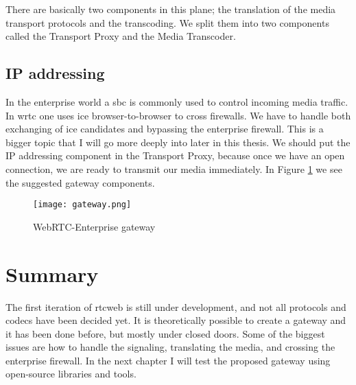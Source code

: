 There are basically two components in this plane; the translation of the media transport protocols and the transcoding. We split them into two components called the Transport Proxy and the Media Transcoder.

\subsection{IP addressing}
In the enterprise world a \gls{sbc} is commonly used to control incoming media traffic. In \gls{wrtc} one uses \gls{ice} browser-to-browser to cross firewalls. We have to handle both exchanging of \gls{ice} candidates and bypassing the enterprise firewall. This is a bigger topic that I will go more deeply into later in this thesis. We should put the IP addressing component in the Transport Proxy, because once we have an open connection, we are ready to transmit our media immediately. In Figure \ref{fig:gateway} we see the suggested gateway components.

\begin{figure}[here]
\centerline{\texttt{[image: gateway.png]}}
\caption{WebRTC-Enterprise gateway}
\label{fig:gateway}
\end{figure}

\section{Summary}
The first iteration of \gls{rtcweb} is still under development, and not all protocols and codecs have been decided yet. It is theoretically possible to create a gateway and it has been done before, but mostly under closed doors. Some of the biggest issues are how to handle the signaling, translating the media, and crossing the enterprise firewall. In the next chapter I will test the proposed gateway using open-source libraries and tools.
